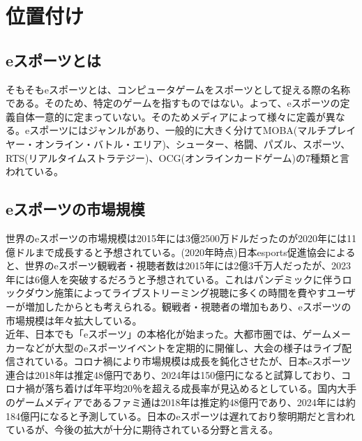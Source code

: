 \section{位置付け}
\subsection{eスポーツとは}
そもそもeスポーツとは、コンピュータゲームをスポーツとして捉える際の名称である。そのため、特定のゲームを指すものではない。よって、eスポーツの定義自体一意的に定まっていない。そのためメディアによって様々に定義が異なる。eスポーツにはジャンルがあり、一般的に大きく分けてMOBA(マルチプレイヤー・オンライン・バトル・エリア)、シューター、格闘、パズル、スポーツ、RTS(リアルタイムストラテジー)、OCG(オンラインカードゲーム)の7種類と言われている。
\subsection{eスポーツの市場規模}
世界のeスポーツの市場規模は2015年には3億2500万ドルだったのが2020年には11億ドルまで成長すると予想されている。(2020年時点)日本esports促進協会によると、世界のeスポーツ観戦者・視聴者数は2015年には2億3千万人だったが、2023年には6億人を突破するだろうと予想されている。これはパンデミックに伴うロックダウン施策によってライブストリーミング視聴に多くの時間を費やすユーザーが増加したからとも考えられる。観戦者・視聴者の増加もあり、eスポーツの市場規模は年々拡大している。\\
近年、日本でも「eスポーツ」の本格化が始まった。大都市圏では、ゲームメーカーなどが大型のeスポーツイベントを定期的に開催し、大会の様子はライブ配信されている。コロナ禍により市場規模は成長を鈍化させたが、日本eスポーツ連合は2018年は推定48億円であり、2024年は150億円になると試算しており、コロナ禍が落ち着けば年平均20％を超える成長率が見込めるとしている。国内大手のゲームメディアであるファミ通は2018年は推定約48億円であり、2024年には約184億円になると予測している。日本のeスポーツは遅れており黎明期だと言われているが、今後の拡大が十分に期待されている分野と言える。
